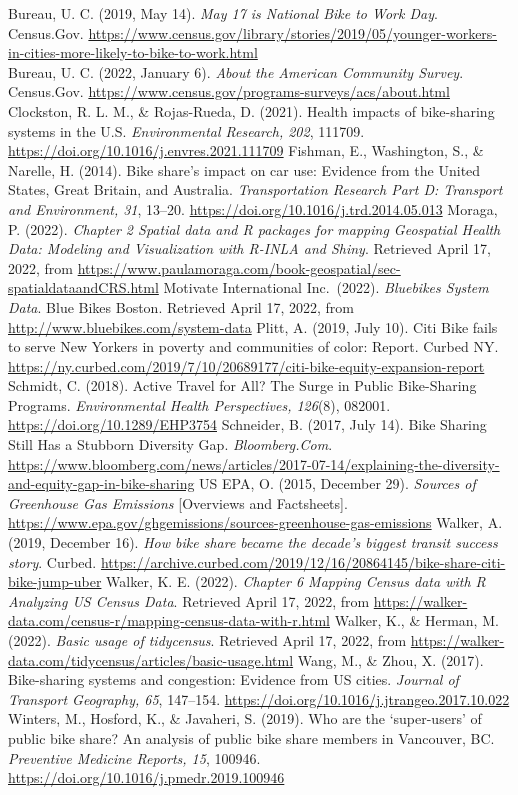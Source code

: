 \documentclass[
  12pt,
]{article}
\begin{document}
Bureau, U. C. (2019, May 14). \emph{May 17 is National Bike to Work
Day}. Census.Gov.
\url{https://www.census.gov/library/stories/2019/05/younger-workers-in-cities-more-likely-to-bike-to-work.html}\\
Bureau, U. C. (2022, January 6). \emph{About the American Community
Survey}. Census.Gov.
\url{https://www.census.gov/programs-surveys/acs/about.html} Clockston,
R. L. M., \& Rojas-Rueda, D. (2021). Health impacts of bike-sharing
systems in the U.S. \emph{Environmental Research, 202}, 111709.
\url{https://doi.org/10.1016/j.envres.2021.111709} Fishman, E.,
Washington, S., \& Narelle, H. (2014). Bike share's impact on car use:
Evidence from the United States, Great Britain, and Australia.
\emph{Transportation Research Part D: Transport and Environment, 31},
13--20. \url{https://doi.org/10.1016/j.trd.2014.05.013} Moraga, P.
(2022). \emph{Chapter 2 Spatial data and R packages for mapping
\textbar{} Geospatial Health Data: Modeling and Visualization with
R-INLA and Shiny}. Retrieved April 17, 2022, from
\url{https://www.paulamoraga.com/book-geospatial/sec-spatialdataandCRS.html}
Motivate International Inc.~(2022). \emph{Bluebikes System Data}. Blue
Bikes Boston. Retrieved April 17, 2022, from
\url{http://www.bluebikes.com/system-data} Plitt, A. (2019, July 10).
Citi Bike fails to serve New Yorkers in poverty and communities of
color: Report. Curbed NY.
\url{https://ny.curbed.com/2019/7/10/20689177/citi-bike-equity-expansion-report}
Schmidt, C. (2018). Active Travel for All? The Surge in Public
Bike-Sharing Programs. \emph{Environmental Health Perspectives, 126}(8),
082001. \url{https://doi.org/10.1289/EHP3754} Schneider, B. (2017, July
14). Bike Sharing Still Has a Stubborn Diversity Gap.
\emph{Bloomberg.Com}.
\url{https://www.bloomberg.com/news/articles/2017-07-14/explaining-the-diversity-and-equity-gap-in-bike-sharing}
US EPA, O. (2015, December 29). \emph{Sources of Greenhouse Gas
Emissions} {[}Overviews and Factsheets{]}.
\url{https://www.epa.gov/ghgemissions/sources-greenhouse-gas-emissions}
Walker, A. (2019, December 16). \emph{How bike share became the decade's
biggest transit success story}. Curbed.
\url{https://archive.curbed.com/2019/12/16/20864145/bike-share-citi-bike-jump-uber}
Walker, K. E. (2022). \emph{Chapter 6 Mapping Census data with R
\textbar{} Analyzing US Census Data}. Retrieved April 17, 2022, from
\url{https://walker-data.com/census-r/mapping-census-data-with-r.html}
Walker, K., \& Herman, M. (2022). \emph{Basic usage of tidycensus}.
Retrieved April 17, 2022, from
\url{https://walker-data.com/tidycensus/articles/basic-usage.html} Wang,
M., \& Zhou, X. (2017). Bike-sharing systems and congestion: Evidence
from US cities. \emph{Journal of Transport Geography, 65}, 147--154.
\url{https://doi.org/10.1016/j.jtrangeo.2017.10.022} Winters, M.,
Hosford, K., \& Javaheri, S. (2019). Who are the `super-users' of public
bike share? An analysis of public bike share members in Vancouver, BC.
\emph{Preventive Medicine Reports, 15}, 100946.
\url{https://doi.org/10.1016/j.pmedr.2019.100946}
\end{document}
